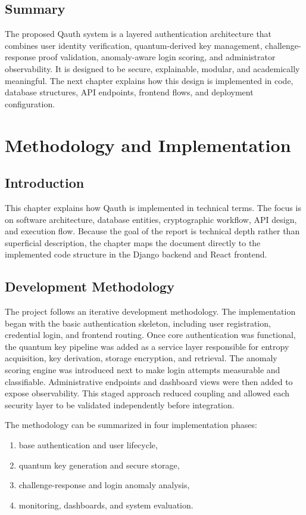 \documentclass[12pt,a4paper]{report}
\begin{document}
\section{Summary}
The proposed Qauth system is a layered authentication architecture that combines user identity verification, quantum-derived key management, challenge-response proof validation, anomaly-aware login scoring, and administrator observability. It is designed to be secure, explainable, modular, and academically meaningful. The next chapter explains how this design is implemented in code, database structures, API endpoints, frontend flows, and deployment configuration.


\chapter{Methodology and Implementation}

\section{Introduction}
This chapter explains how Qauth is implemented in technical terms. The focus is on software architecture, database entities, cryptographic workflow, API design, and execution flow. Because the goal of the report is technical depth rather than superficial description, the chapter maps the document directly to the implemented code structure in the Django backend and React frontend.

\section{Development Methodology}
The project follows an iterative development methodology. The implementation began with the basic authentication skeleton, including user registration, credential login, and frontend routing. Once core authentication was functional, the quantum key pipeline was added as a service layer responsible for entropy acquisition, key derivation, storage encryption, and retrieval. The anomaly scoring engine was introduced next to make login attempts measurable and classifiable. Administrative endpoints and dashboard views were then added to expose observability. This staged approach reduced coupling and allowed each security layer to be validated independently before integration.

The methodology can be summarized in four implementation phases:

\begin{enumerate}
    \item base authentication and user lifecycle,
    \item quantum key generation and secure storage,
    \item challenge-response and login anomaly analysis,
    \item monitoring, dashboards, and system evaluation.
\end{enumerate}
\end{document}
